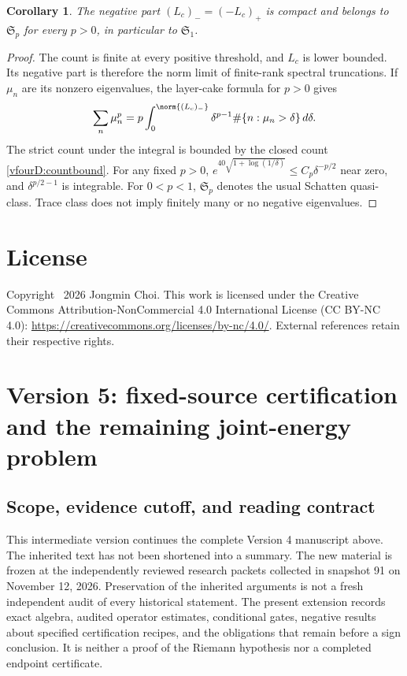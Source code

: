 \documentclass[11pt,a4paper]{article}
\numberwithin{equation}{section}
\newtheorem{corollary}[theorem]{Corollary}
\theoremstyle{definition}\newtheorem{definition}[theorem]{Definition}
\theoremstyle{remark}\newtheorem{remark}[theorem]{Remark}
\begin{document}
\begin{corollary}\label{vfourD:schatten}
The negative part $(L_c)_-=(-L_c)_+$ is compact and belongs to $\mathfrak S_p$ for every $p>0$, in particular to $\mathfrak S_1$.
\end{corollary}
\begin{proof}
The count is finite at every positive threshold, and $L_c$ is lower bounded. Its negative part is therefore the norm limit of finite-rank spectral truncations. If $\mu_n$ are its nonzero eigenvalues, the layer-cake formula for $p>0$ gives
\[\sum_n\mu_n^p=p\int_0^{\norm{(L_c)_-}}\delta^{p-1}\#\{n:\mu_n>\delta\}\,d\delta.
\]
The strict count under the integral is bounded by the closed count \eqref{vfourD:countbound}. For any fixed $p>0$, $e^{40\sqrt{1+\log(1/\delta)}}\le C_p\delta^{-p/2}$ near zero, and $\delta^{p/2-1}$ is integrable. For $0<p<1$, $\mathfrak S_p$ denotes the usual Schatten quasi-class. Trace class does not imply finitely many or no negative eigenvalues.
\end{proof}



\section*{License}
Copyright \textcopyright\ 2026 Jongmin Choi. This work is licensed under the Creative Commons Attribution-NonCommercial 4.0 International License (CC BY-NC 4.0): \url{https://creativecommons.org/licenses/by-nc/4.0/}. External references retain their respective rights.

\renewcommand{\thesection}{V5.\arabic{section}}\renewcommand{\theHsection}{vfive.\arabic{section}}
\setcounter{section}{0}
\clearpage
\section{Version 5: fixed-source certification and the remaining joint-energy problem}\label{vfive:status}
\subsection{Scope, evidence cutoff, and reading contract}
This intermediate version continues the complete Version 4 manuscript above. The inherited text has not been shortened into a summary. The new material is frozen at the independently reviewed research packets collected in snapshot 91 on November 12, 2026. Preservation of the inherited arguments is not a fresh independent audit of every historical statement. The present extension records exact algebra, audited operator estimates, conditional gates, negative results about specified certification recipes, and the obligations that remain before a sign conclusion. It is neither a proof of the Riemann hypothesis nor a completed endpoint certificate.
\end{document}
